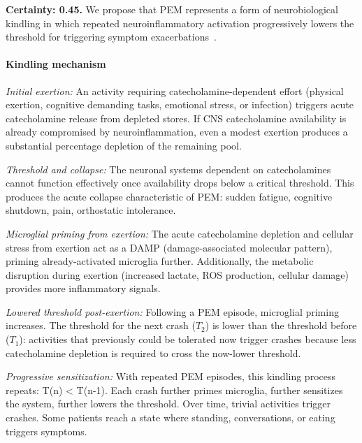\begin{hypothesis}
\label{hyp:pem-kindling-sensitization}
\textbf{Certainty: 0.45.} We propose that PEM represents a form of neurobiological kindling in which repeated neuroinflammatory activation progressively lowers the threshold for triggering symptom exacerbations~\cite{Nakatomi2014neuroinflammation,MCMC2024Neurometabolic,NIH2024MECFSRoadmap}.

\paragraph{Kindling mechanism}

\textit{Initial exertion:} An activity requiring catecholamine-dependent effort (physical exertion, cognitive demanding tasks, emotional stress, or infection) triggers acute catecholamine release from depleted stores. If CNS catecholamine availability is already compromised by neuroinflammation, even a modest exertion produces a substantial percentage depletion of the remaining pool.

\textit{Threshold and collapse:} The neuronal systems dependent on catecholamines cannot function effectively once availability drops below a critical threshold. This produces the acute collapse characteristic of PEM: sudden fatigue, cognitive shutdown, pain, orthostatic intolerance.

\textit{Microglial priming from exertion:} The acute catecholamine depletion and cellular stress from exertion act as a DAMP (damage-associated molecular pattern), priming already-activated microglia further. Additionally, the metabolic disruption during exertion (increased lactate, ROS production, cellular damage) provides more inflammatory signals.

\textit{Lowered threshold post-exertion:} Following a PEM episode, microglial priming increases. The threshold for the next crash ($T_2$) is lower than the threshold before ($T_1$): activities that previously could be tolerated now trigger crashes because less catecholamine depletion is required to cross the now-lower threshold.

\textit{Progressive sensitization:} With repeated PEM episodes, this kindling process repeats: T(n) < T(n-1). Each crash further primes microglia, further sensitizes the system, further lowers the threshold. Over time, trivial activities trigger crashes. Some patients reach a state where standing, conversations, or eating triggers symptoms.


\end{hypothesis}
